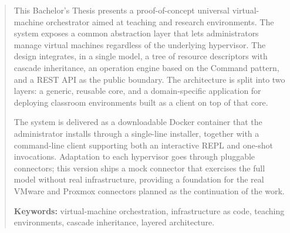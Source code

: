 \renewcommand{\abstractname}{Abstract}
\begin{abstract}
This Bachelor's Thesis presents a proof-of-concept universal
virtual-machine orchestrator aimed at teaching and research
environments. The system exposes a common abstraction layer that lets
administrators manage virtual machines regardless of the underlying
hypervisor. The design integrates, in a single model, a tree of
resource descriptors with cascade inheritance, an operation engine
based on the Command pattern, and a REST API as the public boundary.
The architecture is split into two layers: a generic, reusable core,
and a domain-specific application for deploying classroom environments
built as a client on top of that core.

The system is delivered as a downloadable Docker container that the
administrator installs through a single-line installer, together with
a command-line client supporting both an interactive REPL and one-shot
invocations. Adaptation to each hypervisor goes through pluggable
connectors; this version ships a mock connector that exercises the
full model without real infrastructure, providing a foundation for the
real VMware and Proxmox connectors planned as the continuation of the
work.

\medskip

\noindent\textbf{Keywords:} virtual-machine orchestration,
infrastructure as code, teaching environments, cascade inheritance,
layered architecture.
\end{abstract}
